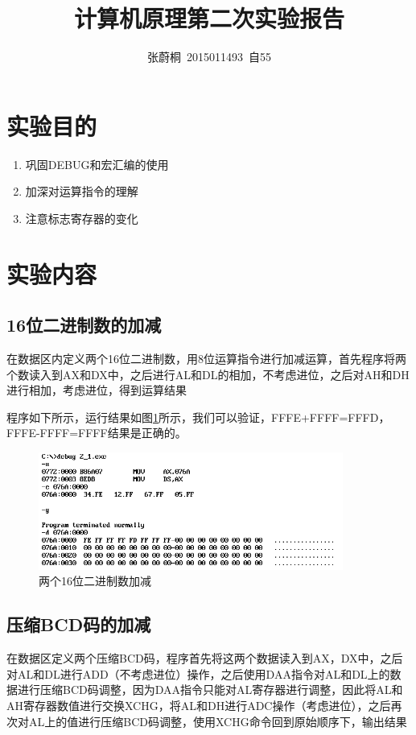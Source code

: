 \documentclass[UTF8,a4paper]{ctexart}
\title{计算机原理第二次实验报告}
\author{张蔚桐\ 2015011493\ 自55}
\begin{document}
\maketitle
\section{实验目的}
\begin{enumerate}
\item 巩固DEBUG和宏汇编的使用
\item 加深对运算指令的理解
\item 注意标志寄存器的变化
\end{enumerate}
\section{实验内容}
\subsection{16位二进制数的加减}
在数据区内定义两个16位二进制数，用8位运算指令进行加减运算，首先程序将两个数读入到AX和DX中，之后进行AL和DL的相加，不考虑进位，之后对AH和DH进行相加，考虑进位，得到运算结果

程序如下所示，运行结果如图\ref{p21}所示，我们可以验证，FFFE+FFFF=FFFD，FFFE-FFFF=FFFF结果是正确的。



\begin{figure}[b]
\centering
\includegraphics[width=100mm]{p21.png}
\caption{两个16位二进制数加减}
\label{p21}
\end{figure}
\clearpage
\subsection{压缩BCD码的加减}
在数据区定义两个压缩BCD码，程序首先将这两个数据读入到AX，DX中，之后对AL和DL进行ADD（不考虑进位）操作，之后使用DAA指令对AL和DL上的数据进行压缩BCD码调整，因为DAA指令只能对AL寄存器进行调整，因此将AL和AH寄存器数值进行交换XCHG，将AL和DH进行ADC操作（考虑进位），之后再次对AL上的值进行压缩BCD码调整，使用XCHG命令回到原始顺序下，输出结果
\end{document}
